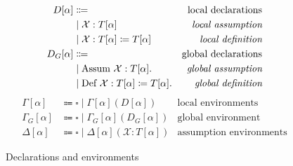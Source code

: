 \begin{figure}
\centering
\begin{align*}
D[\alpha] &\Coloneqq                                            &\text{local declarations} \\
    &\mid \mathcal{X}: T[\alpha]                                &\textit{local assumption} \\
    &\mid \mathcal{X}: T[\alpha] \coloneqq T[\alpha]            &\textit{local definition} \\
D_G[\alpha] &\Coloneqq                                          &\text{global declarations} \\
    &\mid \text{Assum}\ \mathcal{X} : T[\alpha].                        &\textit{global assumption} \\
    &\mid \text{Def}\ \mathcal{X} : T[\alpha] \coloneqq T[\alpha].               &\textit{global definition}
\end{align*}
\begin{align*}
\Gamma[\alpha]   &\Coloneqq \square \mid \Gamma[\alpha] (D[\alpha])              &\text{local environments} \\
\Gamma_G[\alpha] &\Coloneqq \square \mid \Gamma_G[\alpha] (D_G[\alpha])          &\text{global environment} \\
\Delta[\alpha]   &\Coloneqq \square \mid \Delta[\alpha] (\mathcal{X}: T[\alpha]) &\text{assumption environments}
\end{align*}
\caption{Declarations and environments}
\label{fig:contexts}
\end{figure}
